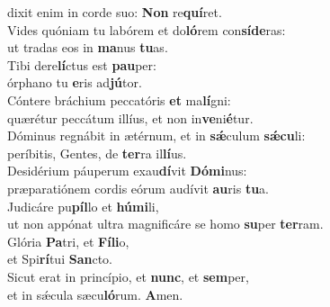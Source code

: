 \evenverse dixit enim in corde suo: \textbf{Non} re\textbf{quí}ret.\\
\oddverse Vides quóniam tu labórem et do\textbf{ló}rem con\textbf{sí}\textbf{de}ras:~\*\\
\oddverse ut tradas eos in \textbf{ma}nus \textbf{tu}as.\\
\evenverse Tibi dere\textbf{lí}ctus est \textbf{pau}per:~\*\\
\evenverse órphano tu \textbf{e}ris ad\textbf{jú}tor.\\
\oddverse Cóntere bráchium peccatóris \textbf{et} ma\textbf{lí}gni:~\*\\
\oddverse quærétur peccátum illíus, et non in\textbf{ve}ni\textbf{é}tur.\\
\evenverse Dóminus regnábit in ætérnum, et in \textbf{sǽ}culum \textbf{sǽ}\textbf{cu}li:~\*\\
\evenverse períbitis, Gentes, de \textbf{ter}ra il\textbf{lí}us.\\
\oddverse Desidérium páuperum exau\textbf{dí}vit \textbf{Dó}\textbf{mi}nus:~\*\\
\oddverse præparatiónem cordis eórum audívit \textbf{au}ris \textbf{tu}a.\\
\evenverse Judicáre pu\textbf{píl}lo et \textbf{hú}\textbf{mi}li,~\*\\
\evenverse ut non appónat ultra magnificáre se homo \textbf{su}per \textbf{ter}ram.\\
\oddverse Glória \textbf{Pa}tri, et \textbf{Fí}\textbf{li}o,~\*\\
\oddverse et Spi\textbf{rí}tui \textbf{San}cto.\\
\evenverse Sicut erat in princípio, et \textbf{nunc}, et \textbf{sem}per,~\*\\
\evenverse et in sǽcula sæcu\textbf{ló}rum. \textbf{A}men.\\
